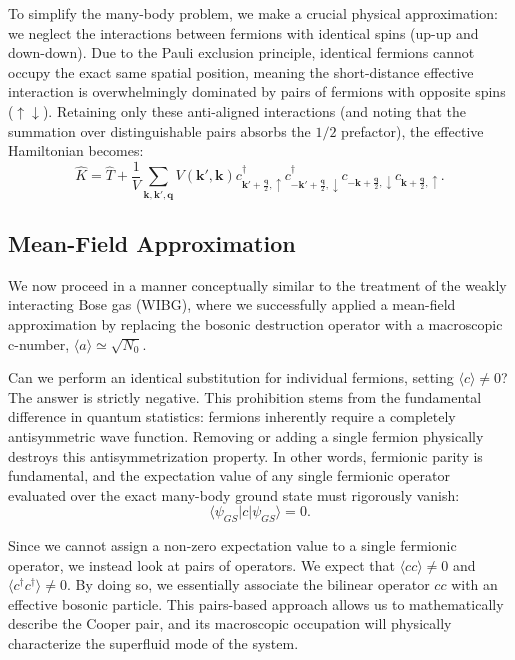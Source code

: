 To simplify the many-body problem, we make a crucial physical approximation: we neglect the interactions between fermions with identical spins (up-up and down-down). Due to the Pauli exclusion principle, identical fermions cannot occupy the exact same spatial position, meaning the short-distance effective interaction is overwhelmingly dominated by pairs of fermions with opposite spins (\( \uparrow \downarrow \)). Retaining only these anti-aligned interactions (and noting that the summation over distinguishable pairs absorbs the \( 1/2 \) prefactor), the effective Hamiltonian becomes:
\[
    \hat{K} = \hat{T} + \frac{1}{V} \sum_{\mathbf{k},\mathbf{k}',\mathbf{q}} V(\mathbf{k}', \mathbf{k}) c_{\mathbf{k}'+\frac{\mathbf{q}}{2},\uparrow}^\dagger c_{-\mathbf{k}'+\frac{\mathbf{q}}{2},\downarrow}^\dagger c_{-\mathbf{k}+\frac{\mathbf{q}}{2},\downarrow} c_{\mathbf{k}+\frac{\mathbf{q}}{2},\uparrow}.
\]

\subsection{Mean-Field Approximation}

We now proceed in a manner conceptually similar to the treatment of the weakly interacting Bose gas (WIBG), where we successfully applied a mean-field approximation by replacing the bosonic destruction operator with a macroscopic c-number, \( \langle a \rangle \simeq \sqrt{N_0} \).

Can we perform an identical substitution for individual fermions, setting \( \langle c \rangle \neq 0 \)? The answer is strictly negative. This prohibition stems from the fundamental difference in quantum statistics: fermions inherently require a completely antisymmetric wave function. Removing or adding a single fermion physically destroys this antisymmetrization property. In other words, fermionic parity is fundamental, and the expectation value of any single fermionic operator evaluated over the exact many-body ground state must rigorously vanish:
\[
    \langle \psi_{GS} | c | \psi_{GS} \rangle = 0.
\]

Since we cannot assign a non-zero expectation value to a single fermionic operator, we instead look at pairs of operators. We expect that \( \langle cc \rangle \neq 0 \) and \( \langle c^\dagger c^\dagger \rangle \neq 0 \). By doing so, we essentially associate the bilinear operator \( cc \) with an effective bosonic particle. This pairs-based approach allows us to mathematically describe the Cooper pair, and its macroscopic occupation will physically characterize the superfluid mode of the system.

